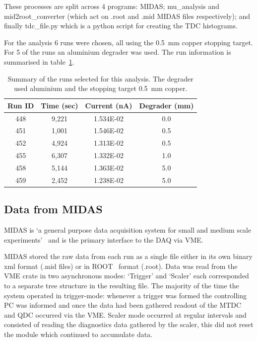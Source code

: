 These processes are split across 4 programs: MIDAS; mu\_analysis and mid2root\_converter (which act on .root and .mid MIDAS files respectively); and finally tdc\_file.py which is a python script for creating the TDC histograms.

For the analysis 6 runs were chosen, all using the 0.5~mm copper stopping target. For 5 of the runs an aluminium degrader was used. The run information is summarised in table~\ref{tab:run_summary}.
\begin{table}
	\begin{center}
	\begin{tabular}{c|c|c|c}
		Run ID & Time (sec) & Current (nA) & Degrader (mm) \\
		\hline
		448    & 9,221      & 1.534E-02    & 0.0   \\
		451    & 1,001      & 1.546E-02    & 0.5   \\
		452    & 4,924      & 1.313E-02    & 0.5   \\
		455    & 6,307      & 1.332E-02    & 1.0   \\
		458    & 5,144      & 1.363E-02    & 5.0   \\
		459    & 2,452      & 1.238E-02    & 5.0   \\
	\end{tabular}
	\end{center}
	\caption{Summary of the runs selected for this analysis. The degrader used aluminium and the stopping target 0.5~mm copper.}
	\label{tab:run_summary}
\end{table} 
\subsection{Data from MIDAS} %
\label{sub:data_from_midas}
MIDAS is `a general purpose data acquisition system for small and medium scale experiments'~\cite{ritt2012midas} and is the primary interface to the DAQ via VME. 

MIDAS stored the raw data from each run as a single file either in its own binary xml format (.mid files) or in ROOT~\cite{Brun199781} format (.root). Data was read from the VME crate in two asynchronous modes: `Trigger' and `Scaler' each corresponded to a separate tree structure in the resulting file. The majority of the time the system operated in trigger-mode: whenever a trigger was formed the controlling PC was informed and once the data had been gathered readout of the MTDC and QDC occurred via the VME. Scaler mode occurred at regular intervals and consisted of reading the diagnostics data gathered by the scaler, this did not reset the module which continued to accumulate data. 

